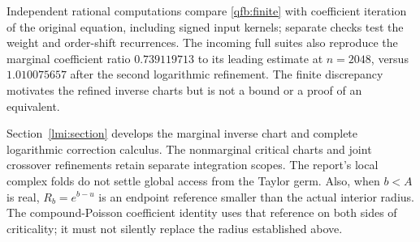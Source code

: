Independent rational computations compare \eqref{qfb:finite} with
coefficient iteration of the original equation, including signed input
kernels; separate checks test the weight and order-shift recurrences.
The incoming full suites also reproduce the marginal coefficient ratio
$0.739119713$ to its leading estimate at $n=2048$, versus $1.010075657$
after the second logarithmic refinement. The finite discrepancy motivates
the refined inverse charts but is not a bound or a proof of an equivalent.

Section~\ref{lmi:section} develops the marginal inverse chart and complete
logarithmic correction calculus. The nonmarginal critical charts and joint
crossover refinements retain separate integration scopes.
The report's local complex folds do not settle global access from the
Taylor germ. Also, when $b<A$ is real, $R_b=e^{b-u}$ is an endpoint
reference smaller than the actual interior radius. The compound-Poisson
coefficient identity uses that reference on both sides of criticality;
it must not silently replace the radius established above.

